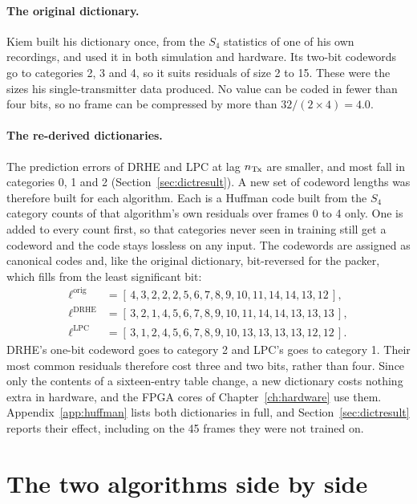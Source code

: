 \paragraph{The original dictionary.} Kiem built his dictionary once, from the
$S_4$ statistics of one of his own recordings, and used it in both simulation
and hardware. Its two-bit codewords go to categories 2, 3 and 4, so it suits
residuals of size 2 to 15. These were the sizes his single-transmitter data
produced. No value can be coded in fewer than four bits, so no frame can be
compressed by more than $32/(2 \times 4) = 4.0$.

\paragraph{The re-derived dictionaries.} The prediction errors of DRHE and LPC
at lag $n_{\mathrm{Tx}}$ are smaller, and most fall in categories 0, 1 and 2
(Section~\ref{sec:dictresult}). A new set of codeword lengths was therefore
built for each algorithm. Each is a Huffman code
\cite{huffman1952}\label{lit:huffman:dict} built from the $S_4$ category counts
of that algorithm's own residuals over frames 0 to 4 only. One is added to
every count first, so that categories never seen in training still get a
codeword and the code stays lossless on any input. The codewords are assigned
as canonical codes and, like the original dictionary, bit-reversed for the
packer, which fills from the least significant bit:
\begin{align*}
\ell^{\mathrm{orig}} &= [\,4,3,2,2,2,5,6,7,8,9,10,11,14,14,13,12\,],\\
\ell^{\mathrm{DRHE}} &= [\,3,2,1,4,5,6,7,8,9,10,11,14,14,13,13,13\,],\\
\ell^{\mathrm{LPC}}  &= [\,3,1,2,4,5,6,7,8,9,10,13,13,13,13,12,12\,].
\end{align*}
DRHE's one-bit codeword goes to category 2 and LPC's goes to category 1. Their
most common residuals therefore cost three and two bits, rather than four.
Since only the contents of a sixteen-entry table change, a new dictionary costs
nothing extra in hardware, and the FPGA cores of Chapter~\ref{ch:hardware} use
them. Appendix~\ref{app:huffman} lists both dictionaries in full, and
Section~\ref{sec:dictresult} reports their effect, including on the 45 frames
they were not trained on.

\section{The two algorithms side by side}

